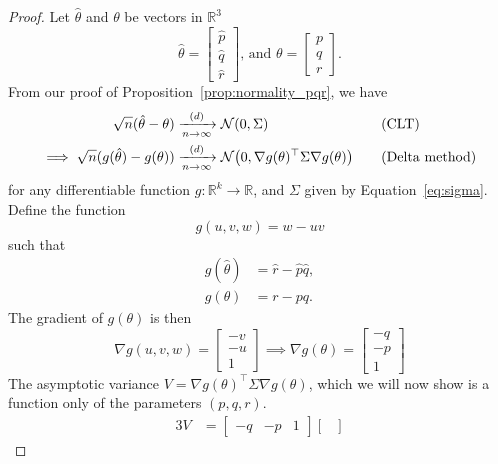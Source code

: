 \documentclass[letterpaper, reqno]{amsart}
\numberwithin{equation}{section}
\newcommand{\T}{\top} %
\newcommand{\R}{\mathbb{R}}  %
\newcommand{\N}[2]{\mathcal{N}\mleft( #1, #2 \mright)}
\newcommand{\by}[1]{&\quad&\text{(#1)}}
\newcommand{\Dlim}{\xrightarrow[n \to \infty]{(d)}}
\newcommand{\phat}{\hat{p}}
\newcommand{\qhat}{\hat{q}}
\newcommand{\rhat}{\hat{r}}
\begin{document}
\begin{proof}
  Let $\hat{\theta}$ and $\theta$ be vectors in $\R^3$
  \begin{equation*}
    \hat{\theta} = \begin{bmatrix} \phat \\ \qhat \\ \rhat \end{bmatrix} \text{, and }
    \theta = \begin{bmatrix} p \\ q \\ r \end{bmatrix}.
  \end{equation*}
  From our proof of Proposition~\ref{prop:normality_pqr}, we have
  \begin{alignat*}{3}
    \sqrt{n}(\hat{\theta} - \theta) &\Dlim \N{0}{\Sigma} \by{CLT} \\
    \implies \sqrt{n}(g(\hat{\theta}) - g(\theta)) &\Dlim \N{0}{\nabla g(\theta)^\T \Sigma
      \nabla g(\theta)} \by{Delta method}
  \end{alignat*}
  for any differentiable function $g \colon \R^k \to \R$, and $\Sigma$ given by
  Equation~\eqref{eq:sigma}.
  Define the function
  \begin{equation} \label{eq:g}
    g(u, v, w) = w - uv
  \end{equation}
  such that
  \begin{align*}
    g(\hat{\theta}) &= \rhat - \phat\qhat, \\
    g(\theta) &= r - pq.
  \end{align*}
  The gradient of $g(\theta)$ is then
  \begin{equation}
    \nabla g(u,v,w) = \begin{bmatrix} -v \\ -u \\ 1 \end{bmatrix}
    \implies \nabla g(\theta) = \begin{bmatrix} -q \\ -p \\ 1 \end{bmatrix}
  \end{equation}
  The asymptotic variance $V = \nabla g(\theta)^\T \Sigma \nabla g(\theta)$,
  which we will now show is a function only of the parameters $(p, q, r)$.
  \begin{alignat*}{3}
    V &= \begin{bmatrix} -q & -p & 1 \end{bmatrix}
    \begin{bmatrix}

\end{bmatrix}
\end{alignat*}
\end{proof}
\end{document}
